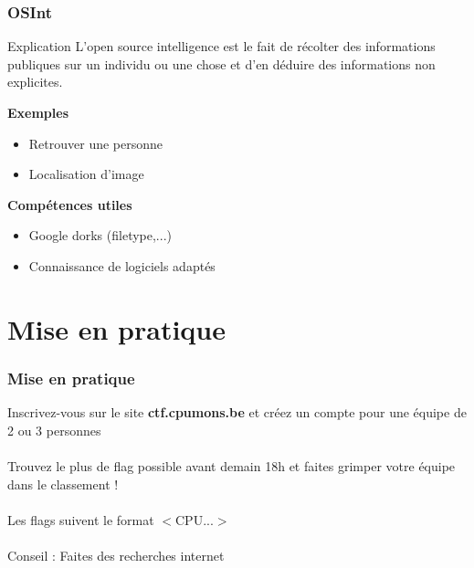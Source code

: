 \documentclass{beamer}
\begin{document}

\begin{frame}
\frametitle{OSInt}

\begin{block}{Explication}
    L'open source intelligence est le fait de récolter des informations publiques sur un individu ou une chose et d'en déduire des informations non explicites.
\end{block}

\pause

\textbf{Exemples}
\begin{itemize}
    \item Retrouver une personne
    \item Localisation d'image
\end{itemize}

\pause

\textbf{Compétences utiles}
\begin{itemize}
    \item Google dorks (filetype,...)
    \item Connaissance de logiciels adaptés
\end{itemize}

\end{frame}




\section{Mise en pratique}

\begin{frame}\frametitle{Mise en pratique}

Inscrivez-vous sur le site \textbf{ctf.cpumons.be} et créez un compte pour une équipe de 2 ou 3 personnes \\~\\

Trouvez le plus de flag possible avant demain 18h et faites grimper votre équipe dans le classement ! \\~\\


Les flags suivent le format $<$CPU...$>$ \\~\\

Conseil : Faites des recherches internet


\end{frame}
\end{document}
